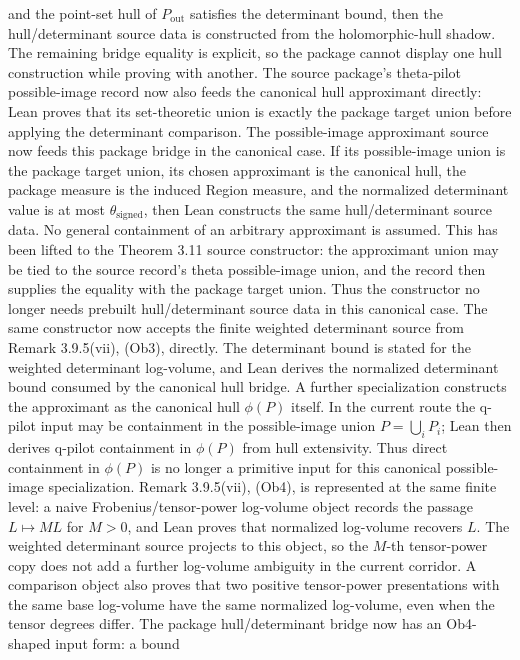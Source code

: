 \documentclass[11pt]{article}
\newcommand{\Lean}{Lean}
\theoremstyle{plain}
\theoremstyle{definition}
\theoremstyle{remark}
\begin{document}
and the point-set hull of \(P_{\mathrm{out}}\) satisfies the determinant
bound, then the hull/determinant source data is constructed from the
holomorphic-hull shadow.  The remaining bridge equality is explicit, so the
package cannot display one hull construction while proving with another.
The source package's theta-pilot possible-image record now also feeds the
canonical hull approximant directly: \Lean{} proves that its set-theoretic
union is exactly the package target union before applying the determinant
comparison.
The possible-image approximant source now feeds this package bridge in the
canonical case.  If its possible-image union is the package target union, its
chosen approximant is the canonical hull, the package measure is the induced
Region measure, and the normalized determinant value is at most
\(\theta_{\mathrm{signed}}\), then \Lean{} constructs the same
hull/determinant source data.  No general containment of an arbitrary
approximant is assumed.
This has been lifted to the Theorem 3.11 source constructor: the approximant
union may be tied to the source record's theta possible-image union, and the
record then supplies the equality with the package target union.  Thus the
constructor no longer needs prebuilt hull/determinant source data in this
canonical case.
The same constructor now accepts the finite weighted determinant source from
Remark 3.9.5(vii), (Ob3), directly.  The determinant bound is stated for the
weighted determinant log-volume, and \Lean{} derives the normalized determinant
bound consumed by the canonical hull bridge.
A further specialization constructs the approximant as the canonical hull
\(\phi(P)\) itself.  In the current route the q-pilot input may be containment
in the possible-image union \(P=\bigcup_i P_i\); \Lean{} then derives
q-pilot containment in \(\phi(P)\) from hull extensivity.  Thus direct
containment in \(\phi(P)\) is no longer a primitive input for this canonical
possible-image specialization.
Remark 3.9.5(vii), (Ob4), is represented at the same finite level: a naive
Frobenius/tensor-power log-volume object records the passage
\(L\mapsto M L\) for \(M>0\), and \Lean{} proves that normalized log-volume
recovers \(L\).  The weighted determinant source projects to this object, so
the \(M\)-th tensor-power copy does not add a further log-volume ambiguity in
the current corridor.  A comparison object also proves that two positive
tensor-power presentations with the same base log-volume have the same
normalized log-volume, even when the tensor degrees differ.
The package hull/determinant bridge now has an Ob4-shaped input form: a bound
\end{document}
